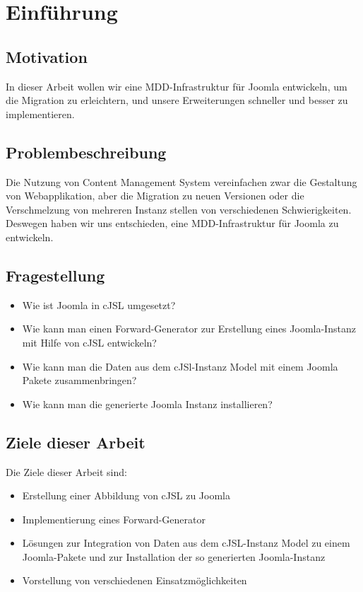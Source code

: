 \chapter{Einführung}
\begin{quote}

\end{quote} 

\section{Motivation}

In dieser Arbeit wollen wir eine MDD-Infrastruktur für Joomla entwickeln, um die Migration  zu erleichtern, und unsere Erweiterungen schneller und besser zu implementieren.

\section{Problembeschreibung}
Die Nutzung von Content Management System vereinfachen zwar die Gestaltung von Webapplikation, aber die Migration  zu    neuen Versionen oder die Verschmelzung von mehreren Instanz stellen von verschiedenen Schwierigkeiten. Deswegen haben wir uns entschieden, eine MDD-Infrastruktur für Joomla zu entwickeln.   

\section{Fragestellung}
\begin{itemize}
\item Wie ist  Joomla in cJSL umgesetzt?
\item Wie kann man einen Forward-Generator zur Erstellung eines Joomla-Instanz\cite{xtext} mit Hilfe von cJSL entwickeln?
\item Wie kann man die  Daten aus dem cJSl-Instanz Model  mit einem Joomla Pakete zusammenbringen?
\item Wie kann man die generierte Joomla Instanz installieren?
\end{itemize}

\section{Ziele dieser Arbeit}

Die Ziele dieser Arbeit sind:

\begin{itemize}
\item Erstellung einer Abbildung von cJSL zu Joomla
\item Implementierung eines Forward-Generator
\item Lösungen zur Integration von Daten aus dem cJSL-Instanz Model zu einem Joomla-Pakete und zur Installation der so generierten Joomla-Instanz
\item Vorstellung von verschiedenen Einsatzmöglichkeiten
\end{itemize}

